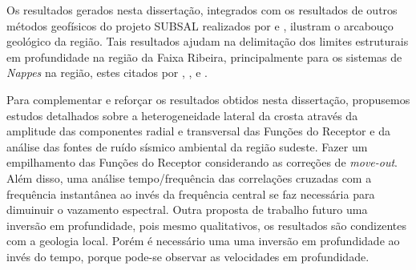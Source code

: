Os resultados gerados nesta dissertação, integrados com os resultados de outros métodos geofísicos do projeto SUBSAL realizados por \cite{flora_solon_ancient_2013} e \cite{Silva_2014}, ilustram o arcabouço geológico da região. Tais resultados ajudam na delimitação dos limites estruturais em profundidade na região da Faixa Ribeira, principalmente para os sistemas de \textit{Nappes} na região, estes citados por  \cite{heilbron_evolution_2010}, \cite{valeriano_u_pb_2011},  \cite{heilbron_serra_2013} e \cite{trouw_new_2013}. 

Para complementar e reforçar os resultados obtidos nesta dissertação, propusemos estudos detalhados sobre a heterogeneidade lateral da crosta através da amplitude das componentes radial e transversal das Funções do Receptor e da análise das fontes de ruído sísmico ambiental da região sudeste. Fazer um empilhamento das Funções do Receptor considerando as correções de \textit{move-out}. Além disso, uma análise tempo/frequência das correlações cruzadas com a frequência instantânea ao invés da frequência central se faz necessária para dimuinuir o vazamento espectral. Outra proposta de trabalho futuro uma inversão em profundidade, pois mesmo qualitativos, os resultados são condizentes com a geologia local. Porém é necessário uma uma inversão em profundidade ao invés do tempo, porque pode-se observar as velocidades em profundidade.